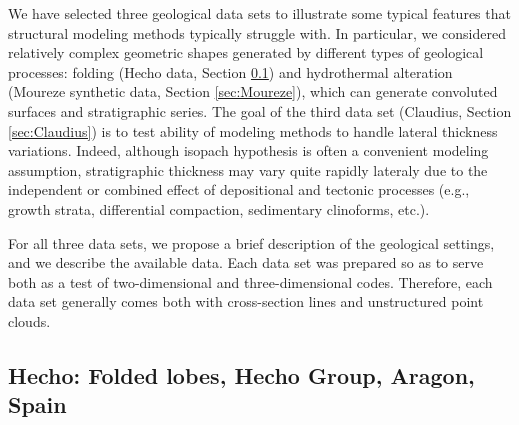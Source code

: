 \documentclass[final]{ring20}
\begin{document}
{We have selected three geological data sets to illustrate some typical features that structural modeling methods typically struggle with. In particular, we considered relatively complex geometric shapes generated by different types of geological processes: folding (Hecho data, Section \ref{sec:Hecho}) and hydrothermal alteration (Moureze synthetic data, Section \ref{sec:Moureze}), which can generate convoluted surfaces and stratigraphic series. The goal of the third data set (Claudius, Section \ref{sec:Claudius}) is to test ability of modeling methods to handle lateral thickness variations. Indeed, although isopach hypothesis is often a convenient modeling assumption, stratigraphic thickness may vary quite rapidly lateraly due to the independent or combined effect of depositional and tectonic processes (e.g., growth strata, differential compaction, sedimentary clinoforms, etc.). 

For all three data sets, we propose a brief description of the geological settings, and we describe the available data. Each data set was prepared so as to serve both as a test of two-dimensional and three-dimensional codes. Therefore, each data set generally comes both with cross-section lines and unstructured point clouds.


\subsection{Hecho: Folded lobes, Hecho Group, Aragon, Spain}
\label{sec:Hecho}

}
\end{document}
